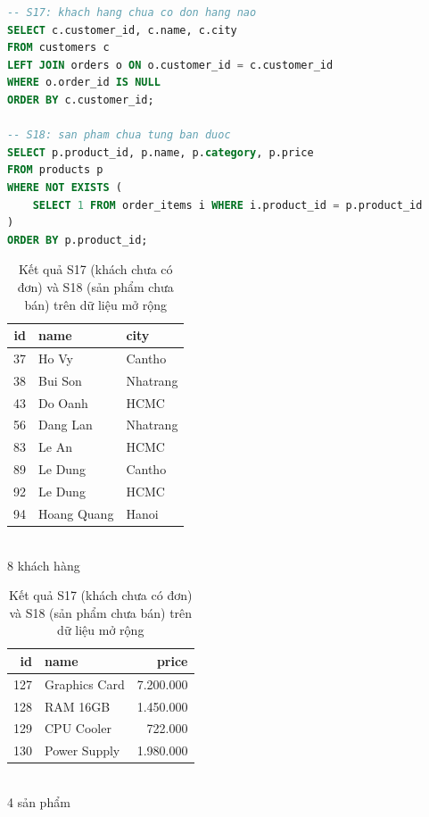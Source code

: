 \documentclass[12pt,a4paper]{article}
\begin{document}
\begin{lstlisting}[language=SQL,caption={S17 và S18}]
-- S17: khach hang chua co don hang nao
SELECT c.customer_id, c.name, c.city
FROM customers c
LEFT JOIN orders o ON o.customer_id = c.customer_id
WHERE o.order_id IS NULL
ORDER BY c.customer_id;

-- S18: san pham chua tung ban duoc
SELECT p.product_id, p.name, p.category, p.price
FROM products p
WHERE NOT EXISTS (
    SELECT 1 FROM order_items i WHERE i.product_id = p.product_id
)
ORDER BY p.product_id;
\end{lstlisting}

\begin{table}[H]
\centering
\caption{Kết quả S17 (khách chưa có đơn) và S18 (sản phẩm chưa bán) trên dữ liệu mở rộng}
\label{tab:s17s18}
\small
\begin{minipage}[t]{0.44\linewidth}
\centering
\begin{tabular}{@{}r l l@{}}
\toprule
\textbf{id} & \textbf{name} & \textbf{city} \\
\midrule
37 & Ho Vy        & Cantho \\
38 & Bui Son      & Nhatrang \\
43 & Do Oanh      & HCMC \\
56 & Dang Lan     & Nhatrang \\
83 & Le An        & HCMC \\
89 & Le Dung      & Cantho \\
92 & Le Dung      & HCMC \\
94 & Hoang Quang  & Hanoi \\
\bottomrule
\end{tabular}
\\[2pt]{\footnotesize 8 khách hàng}
\end{minipage}\hfill
\begin{minipage}[t]{0.5\linewidth}
\centering
\begin{tabular}{@{}r l r@{}}
\toprule
\textbf{id} & \textbf{name} & \textbf{price} \\
\midrule
127 & Graphics Card & 7.200.000 \\
128 & RAM 16GB      & 1.450.000 \\
129 & CPU Cooler    &   722.000 \\
130 & Power Supply  & 1.980.000 \\
\bottomrule
\end{tabular}
\\[2pt]{\footnotesize 4 sản phẩm}
\end{minipage}
\end{table}
\end{document}
